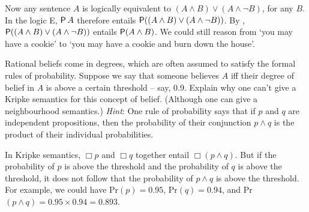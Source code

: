 Now any sentence $A$ is logically equivalent to
$(A \land B) \lor (A \land \neg B)$, for any $B$. In the logic E, $\operatorname{\mathsf{P}} A$
therefore entails $\operatorname{\mathsf{P}} ((A \land B) \lor (A \land \neg B))$. By ,
$\operatorname{\mathsf{P}} ((A \land B) \lor (A \land \neg B))$ entails $\operatorname{\mathsf{P}} (A \land B)$. We could
still reason from `you may have a cookie' to `you may have a cookie and burn
down the house'.

\begin{exercise}
  Rational beliefs come in degrees, which are often assumed to satisfy the
  formal rules of probability. Suppose we say that someone believes $A$ iff
  their degree of belief in $A$ is above a certain threshold -- say, 0.9.
  Explain why one can't give a Kripke semantics for this concept of belief.
  (Although one can give a neighbourhood semantics.) \emph{Hint}: One rule of
  probability says that if $p$ and $q$ are independent propositions, then the
  probability of their conjunction $p \land q$ is the product of their
  individual probabilities.
\end{exercise}
\begin{solution}
  In Kripke semantics, $\Box p$ and $\Box q$ together entail $\Box(p \land
  q)$. But if the probability of $p$ is above the threshold and the probability
  of $q$ is above the threshold, it does not follow that the probability of
  $p\land q$ is above the threshold. For example, we could have Pr$(p)=0.95$,
  Pr$(q)=0.94$, and Pr$(p \land q) = 0.95 \times 0.94 = 0.893$.
\end{solution}




